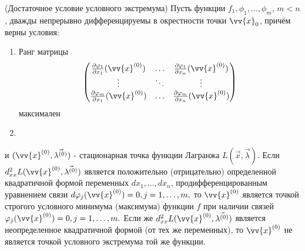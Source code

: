 \begin{theorem} (Достаточное условие условного экстремума)
    Пусть функции $f_1, \phi_1, \dots, \phi_m$, $m < n$, дважды непрерывно дифференцируемы в окрестности точки $\vv{x}_0$, причём верны условия:
    \begin{enumerate}
    	\item Ранг матрицы \[
    		\begin{pmatrix}
	    		\frac{\vdelta \phi_1}{\vdelta x_1}(\vv{x}^{(0)}) & \dots & \frac{\vdelta \phi_1}{\vdelta x_n}(\vv{x}^{(0)})
	    		\\
	    		\vdots & \ddots & \vdots
	    		\\
	    		\frac{\vdelta \phi_m}{\vdelta x_1}(\vv{x}^{(0)}) & \dots & \frac{\vdelta \phi_m}{\vdelta x_n}(\vv{x}^{(0)})
	    		\\
    		\end{pmatrix}
    	\]
    	максимален
    	
    	\item 
    \end{enumerate}
	и $(\vv{x}^{(0)}, \vec{\lambda^{(0)}})$ - стационарная точка функции Лагранжа $L(\vec{x}, \vec{\lambda}).$ Если \\
    $d^2_{xx} L(\vv{x}^{(0)}, \vec{\lambda^{(0)}})$ является положительно (отрицательно) определенной квадратичной формой переменных $dx_1, \dots, dx_n$, продифференцированным уравнением связи $d\phi_j (\vv{x}^{(0)}) = 0, j = 1, \dots, m,$ то $\vv{x}^{(0)}$ является точкой строгого условного минимума (максимума) функции $f$ при наличии связей $\phi_j(\vv{x}^{(0)}) = 0, j = 1, \dots, m.$ Если же $d^2_{xx} L(\vv{x}^{(0)}, \vec{\lambda^{(0)}})$ является неопределенное квадратичной формой (от тех же переменных), то $\vv{x}^{(0)}$ не является точкой условного экстремума той же функции.
\end{theorem}

